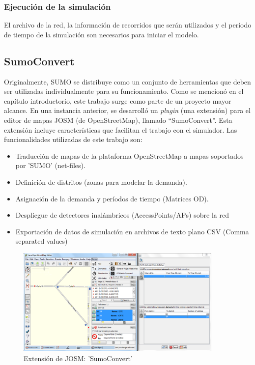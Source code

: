 \subsubsection*{Ejecución de la simulación}
   El archivo de la red, la información de recorridos que serán utilizados y el período de tiempo de la simulación son necesarios para iniciar el modelo.
    
\subsection{SumoConvert}

Originalmente, SUMO se distribuye como un conjunto de herramientas que deben ser utilizadas individualmente para su funcionamiento. Como se mencionó en el capítulo introductorio, este trabajo surge como parte de un proyecto mayor alcance. En una instancia anterior, se desarrolló un \textit{plugin} (una extensión) para el editor de mapas JOSM (de OpenStreetMap), llamado ``SumoConvert''. Esta extensión incluye características que facilitan el trabajo con el simulador. Las funcionalidades utilizadas de este trabajo son:
\begin{itemize}
    \item Traducción de mapas de la plataforma OpenStreetMap a mapas soportados por 'SUMO' (net-files).
    \item Definición de distritos (zonas para modelar la demanda).
    \item Asignación de la demanda y períodos de tiempo (Matrices OD).
    \item Despliegue de detectores inalámbricos (AccessPoints/APs) sobre la red
    \item Exportación de datos de simulación en archivos de texto plano CSV (Comma separated values) 
\end{itemize}

 \begin{figure}[!htp]
	\centering
	\includegraphics[width=0.9\textwidth]{images/osm2sumo.png}
	\caption{Extensión de JOSM: 'SumoConvert'}
    \label{fig:sumoconvert}
\end{figure}
    
